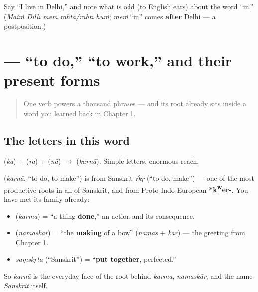\begin{tcolorbox}[breakable,colback=teal!4,colframe=teal!35!black,title={Before you move on}]
Say \textquotedblleft{}I live in Delhi,\textquotedblright{} and note what is odd (to English ears) about the word \textquotedblleft{}in.\textquotedblright{} (\emph{Maiṁ Dillī meṁ rahtā/rahtī hūṁ}; \emph{meṁ} \textquotedblleft{}in\textquotedblright{} comes \textbf{after} Delhi — a postposition.)
\end{tcolorbox}
\section[\texorpdfstring{\hi{करना} / \hi{काम} \hi{करना} … (karnā / kām …)}{करना / काम करना … (karnā / kām …)}]{ — \textquotedblleft{}to do,\textquotedblright{} \textquotedblleft{}to work,\textquotedblright{} and their present forms}

\label{lesson:HI-C05-karna}



\begin{quote}
One verb powers a thousand phrases — and its root already sits inside a word you learned back in Chapter 1.
\end{quote}

\subsection*{The letters in this word}
\textbf{} (\emph{ka}) + \textbf{} (\emph{ra}) + \textbf{} (\emph{nā}) $\to$ \textbf{} (\emph{karnā}). Simple letters, enormous reach.

\begin{cousinweb}
\textbf{} (\emph{karnā}, \textquotedblleft{}to do, to make\textquotedblright{}) is from Sanskrit \emph{√kṛ} (\textquotedblleft{}to do, make\textquotedblright{}) — one of the most productive roots in all of Sanskrit, and from Proto-Indo-European \textbf{*k\textsuperscript{w}er-}. You have met its family already:

\begin{itemize}
\raggedright
  \item \textbf{} (\emph{karma}) = \textquotedblleft{}a thing \textbf{done},\textquotedblright{} an action and its consequence.
  \item \textbf{} (\emph{namaskār}) = \textquotedblleft{}the \textbf{making} of a bow\textquotedblright{} (\emph{namas} + \emph{kār}) — the greeting from Chapter 1.
  \item \emph{saṃskṛta} (\textquotedblleft{}Sanskrit\textquotedblright{}) = \textquotedblleft{}\textbf{put together}, perfected.\textquotedblright{}
\end{itemize}

So \emph{karnā} is the everyday face of the root behind \emph{karma}, \emph{namaskār}, and the name \emph{Sanskrit} itself.
\end{cousinweb}

